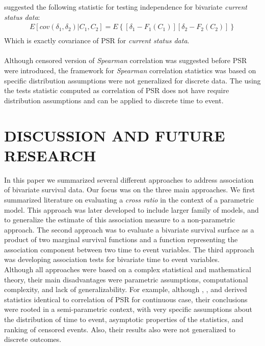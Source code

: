 \documentclass[]{article}
\begin{document}
\cite{ding2004testing} suggested the following statistic for testing independence for bivariate \emph{current status data}:
	$$
	\begin{aligned}
		 E[cov(\delta_1, \delta_2)|C_1,C_2] = E\left\{ [\delta_1 - F_1(C_1)][\delta_2 - F_2(C_2)]  \right\}\\
	\end{aligned}
	$$
Which is exactly covariance of PSR for \emph{current status data}.\\
~\\
Although censored version of \emph{Spearman} correlation was suggested before PSR were introduced, the framework for \emph{Spearman} correlation statistics was based on specific distribution assumptions were not generalized for discrete data. The using the tests statistic computed as correlation of PSR does not have require distribution assumptions and can be applied to discrete time to event.

\section{DISCUSSION AND FUTURE RESEARCH}

In this paper we summarized several different approaches to address association of bivariate survival data. Our focus was on the three main approaches. We first summarized literature on evaluating a \emph{cross ratio} in the context of a parametric model. This approach was later developed to include larger family of models, and to generalize the estimate of this association measure to a non-parametric approach. The second approach was to evaluate a bivariate survival surface as a product of two marginal survival functions and a function representing the association component between two time to event variables. The third approach was developing association tests for bivariate time to event variables.\\

Although all approaches were based on a complex statistical and mathematical theory, their main disadvantages were parametric assumptions, computational complexity, and lack of generalizability. For example, although \cite{cuzick1982rank}, \cite{dabrowska1988kaplan}, and \cite{ding2004testing} derived statistics identical to correlation of PSR for continuous case, their conclusions were rooted in a semi-parametric context, with very specific assumptions about the distribution of time to event, asymptotic properties of the statistics, and ranking of censored events. Also, their results also were not generalized to discrete outcomes.\\
\end{document}
